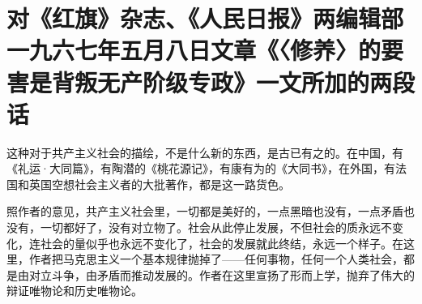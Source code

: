\section[对《红旗》杂志、《人民日报》两编辑部一九六七年五月八日文章《〈修养〉的要害是背叛无产阶级专政》一文所加的两段话（一九六七年五月七日）]{对《红旗》杂志、《人民日报》两编辑部一九六七年五月八日文章《〈修养〉的要害是背叛无产阶级专政》一文所加的两段话}


这种对于共产主义社会的描绘，不是什么新的东西，是古已有之的。在中国，有《礼运·大同篇》，有陶潜的《桃花源记》，有康有为的《大同书》，在外国，有法国和英国空想社会主义者的大批著作，都是这一路货色。

照作者的意见，共产主义社会里，一切都是美好的，一点黑暗也没有，一点矛盾也没有，一切都好了，没有对立物了。社会从此停止发展，不但社会的质永远不变化，连社会的量似乎也永远不变化了，社会的发展就此终结，永远一个样子。在这里，作者把马克思主义一个基本规律抛掉了——任何事物，任何一个人类社会，都是由对立斗争，由矛盾而推动发展的。作者在这里宣扬了形而上学，抛弃了伟大的辩证唯物论和历史唯物论。

